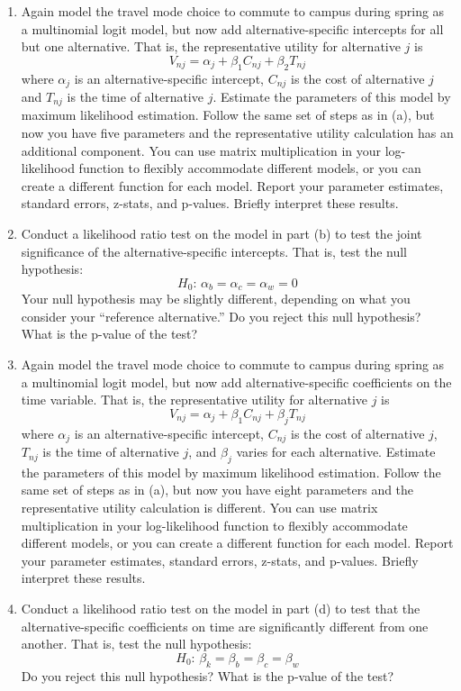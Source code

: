 \documentclass[11pt,letterpaper]{article}
\begin{document}
\begin{enumerate}[label=\alph*., leftmargin=*]
	\item Again model the travel mode choice to commute to campus during spring as a multinomial logit model, but now add alternative-specific intercepts for all but one alternative. That is, the representative utility for alternative $j$ is
	$$V_{nj} = \alpha_j + \beta_1 C_{nj} + \beta_2 T_{nj}$$
	where $\alpha_j$ is an alternative-specific intercept, $C_{nj}$ is the cost of alternative $j$ and $T_{nj}$ is the time of alternative $j$. Estimate the parameters of this model by maximum likelihood estimation. Follow the same set of steps as in (a), but now you have five parameters and the representative utility calculation has an additional component. You can use matrix multiplication in your log-likelihood function to flexibly accommodate different models, or you can create a different function for each model. Report your parameter estimates, standard errors, z-stats, and p-values. Briefly interpret these results.
	
	\item Conduct a likelihood ratio test on the model in part (b) to test the joint significance of the alternative-specific intercepts. That is, test the null hypothesis:
	$$H_0 \text{: } \alpha_b = \alpha_c = \alpha_w = 0$$
	Your null hypothesis may be slightly different, depending on what you consider your ``reference alternative.'' Do you reject this null hypothesis? What is the p-value of the test?
	
	\item Again model the travel mode choice to commute to campus during spring as a multinomial logit model, but now add alternative-specific coefficients on the time variable. That is, the representative utility for alternative $j$ is
	$$V_{nj} = \alpha_j + \beta_1 C_{nj} + \beta_j T_{nj}$$
	where $\alpha_j$ is an alternative-specific intercept, $C_{nj}$ is the cost of alternative $j$, $T_{nj}$ is the time of alternative $j$, and $\beta_j$ varies for each alternative. Estimate the parameters of this model by maximum likelihood estimation. Follow the same set of steps as in (a), but now you have eight parameters and the representative utility calculation is different. You can use matrix multiplication in your log-likelihood function to flexibly accommodate different models, or you can create a different function for each model. Report your parameter estimates, standard errors, z-stats, and p-values. Briefly interpret these results.
	
	\item Conduct a likelihood ratio test on the model in part (d) to test that the alternative-specific coefficients on time are significantly different from one another. That is, test the null hypothesis:
	$$H_0 \text{: } \beta_k = \beta_b = \beta_c = \beta_w$$
	Do you reject this null hypothesis? What is the p-value of the test?
\end{enumerate}
\end{document}
